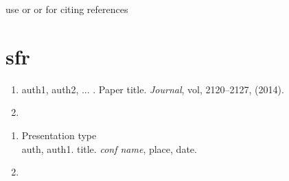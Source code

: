 \documentclass[PhD]{iitmdiss}
\begin{document}
use \citep{r1} or \cite{r2} or \citet{r1} for citing references


\chapter{sfr}\label{basics}

 

 
\appendix 




\begin{singlespace}
  
\end{singlespace}



\listofpapers

\begin{enumerate}  
\item auth1, auth2, ... . Paper title. {\em Journal}, vol,
  2120--2127, (2014).
\item 
\end{enumerate}  

\begin{enumerate}
\item Presentation type\\ {auth}, auth1. {title}. {\textit{conf name}}, place, date.  
\item   
\end{enumerate}
\end{document}
